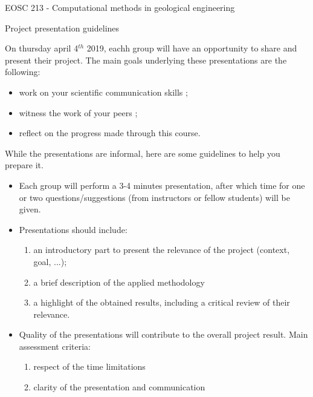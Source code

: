 \documentclass{article}
\begin{document}
\pagestyle{empty}

\begin{center}
\huge{EOSC 213 - Computational methods in geological engineering}
\vspace{0.5cm}

\Large{Project presentation guidelines}
\end{center}
\vspace{1cm}

On thursday april 4$^{th}$ 2019, eachh group will have an opportunity to share and present their project. The main goals underlying these presentations are the following:

\begin{itemize}
	\item work on your scientific communication skills ;
	\item witness the work of your peers ;
	\item reflect on the progress made through this course.
\end{itemize}

While the presentations are informal, here are some guidelines to help you prepare it.

\begin{itemize}
\item Each group will perform a 3-4 minutes presentation, after which time for one or two questions/suggestions (from instructors or fellow students) will be given.
\item Presentations should include:
	\begin{enumerate}
		\item an introductory part to present the relevance of the project (context, goal, ...);
		\item a brief description of the applied methodology
		\item a highlight of the obtained results, including a critical review of their relevance.
	\end{enumerate}
\item Quality of the presentations will contribute to the overall project result. Main assessment criteria:
	\begin{enumerate}
		\item respect of the time limitations
		\item clarity of the presentation and communication
	\end{enumerate}
\end{itemize}
\end{document}
